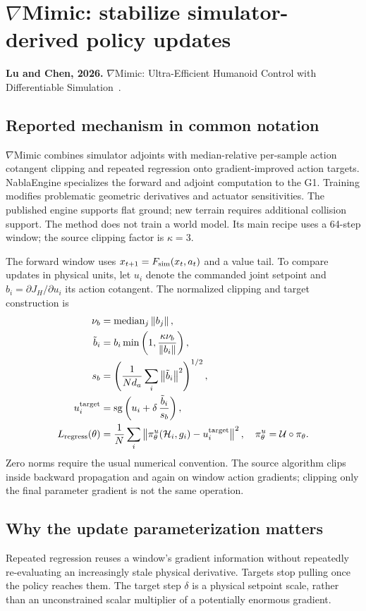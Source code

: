 \section{\texorpdfstring{$\nabla$Mimic}{NablaMimic}: stabilize simulator-derived policy updates}\label{sec:nablamimic}
\textbf{Lu and Chen, 2026.} $\nabla$Mimic: Ultra-Efficient Humanoid Control
with Differentiable Simulation~\cite{nablamimic}.

\subsection{Reported mechanism in common notation}
$\nabla$Mimic combines simulator adjoints with median-relative per-sample action
cotangent clipping and repeated regression onto gradient-improved action targets.
NablaEngine specializes the forward and adjoint computation to the G1. Training
modifies problematic geometric derivatives and actuator sensitivities. The
published engine supports flat ground; new terrain requires additional collision
support. The method does not train a world model. Its main recipe uses a
64-step window; the source clipping factor is $\kappa=3$.

The forward window uses $x_{t+1}=F_{\mathrm{sim}}(x_t,a_t)$ and a value tail. To compare
updates in physical units, let $u_i$ denote the commanded joint setpoint and
$b_i=\partial J_H/\partial u_i$ its action cotangent. The normalized clipping and
target construction is
\begin{align}
\nu_b&=\operatorname{median}_j\left\lVert b_j\right\rVert,\\
\tilde b_i&=b_i\min\left(1,\frac{\kappa\nu_b}{\left\lVert b_i\right\rVert}\right),\\
s_b&=\left(\frac1{Nd_a}\sum_i\left\lVert\tilde b_i\right\rVert^2\right)^{1/2},\\
u_i^{\rm target}&=\operatorname{sg}\left(u_i+\delta\,\frac{\tilde b_i}{s_b}\right),\\
L_{\rm regress}(\theta)&=\frac1N\sum_i
\left\lVert\pi_\theta^u(\mathcal H_i,g_i)-u_i^{\rm target}\right\rVert^2,
\quad\pi_\theta^u=\mathcal U\circ\pi_\theta.
\end{align}
Zero norms require the usual numerical convention. The source algorithm clips
inside backward propagation and again on window action gradients; clipping only
the final parameter gradient is not the same operation.

\subsection{Why the update parameterization matters}
Repeated regression reuses a window's gradient information without repeatedly
re-evaluating an increasingly stale physical derivative. Targets stop pulling
once the policy reaches them. The target step $\delta$ is a physical setpoint
scale, rather than an unconstrained scalar multiplier of a potentially enormous
gradient.

